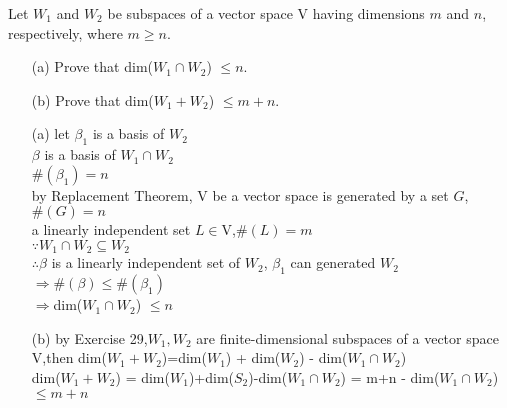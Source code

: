 Let $W_1$ and $W_2$ be subspaces of a vector space V having dimensions $m$ and $n$, respectively, where $m \geq n$.

\begin{enumerate}
	\item[(a)] Prove that dim($W_1 \cap W_2$) $\leq n$.
	\item[(b)] Prove that dim($W_1 + W_2$) $\leq m+n$.
\end{enumerate}

\begin{tcolorbox}
	\begin{solution}
		\begin{enumerate}
			\item[(a)] let $\beta_1$ is a basis of $W_2$\\
			$\beta$ is a basis of $W_1 \cap W_2$\\
			$\#(\beta_1) = n$\\
			
			by Replacement Theorem, V be a vector space is generated by a set $G$, $\#(G)=n$\\
			a linearly independent set $L \in \mathrm{V}$,$\#(L) = m$\\
			$\because W_1 \cap W_2 \subseteq W_2$\\
			$\therefore \beta$ is a linearly independent set of $W_2$, $\beta_1$ can generated $W_2$\\
			$\Rightarrow \#(\beta) \leq \#(\beta_1)$\\
			$\Rightarrow $dim($W_1 \cap W_2$) $\leq n$
			\item[(b)] by Exercise 29,$W_1,W_2$ are finite-dimensional subspaces of a vector space V,then dim($W_1 + W_2$)=dim($W_1$) + dim($W_2$) - dim($W_1 \cap W_2$)\\
			dim($W_1 + W_2$) = dim($W_1$)+dim($S_2$)-dim($W_1 \cap W_2$) = m+n - dim($W_1 \cap W_2$) $\leq m+n$
		\end{enumerate}
	\end{solution}
\end{tcolorbox}